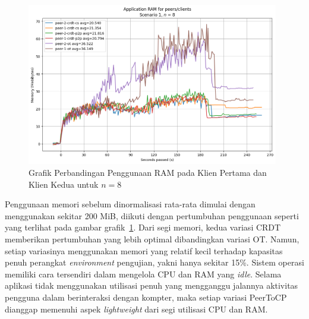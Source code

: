 \begin{figure}
 \centering
 \includegraphics[width=11cm]{./assets/skripsi/benchmark-vis_cell_2_output_21}
 \caption{Grafik Perbandingan Penggunaan RAM pada Klien Pertama dan Klien Kedua untuk $n = 8$}
 \label{fig:2-21}
\end{figure}

Penggunaan memori sebelum dinormalisasi rata-rata dimulai dengan menggunakan sekitar 200 MiB, diikuti dengan pertumbuhan penggunaan seperti yang terlihat pada gambar grafik~\ref{fig:2-21}. Dari segi memori, kedua variasi CRDT memberikan pertumbuhan yang lebih optimal dibandingkan variasi OT. Namun, setiap variasinya menggunakan memori yang relatif kecil terhadap kapasitas penuh perangkat \textit{environment} pengujian, yakni hanya sekitar 15\%. Sistem operasi memiliki cara tersendiri dalam mengelola CPU dan RAM yang \textit{idle}. Selama aplikasi tidak menggunakan utilisasi penuh yang mengganggu jalannya aktivitas pengguna dalam berinteraksi dengan kompter, maka setiap variasi PeerToCP dianggap memenuhi aspek \textit{lightweight} dari segi utilisasi CPU dan RAM.

